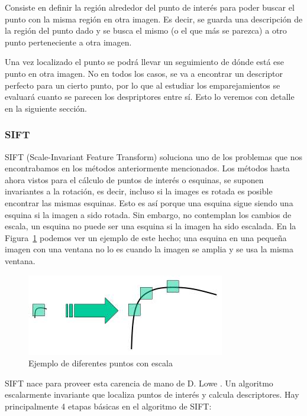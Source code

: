 Consiste en definir la región alrededor del punto de interés para poder buscar el punto con la misma región en otra imagen. Es decir, se guarda una descripción de la región del punto dado y se busca el mismo (o el que más se parezca) a otro punto perteneciente a otra imagen.

Una vez localizado el punto se podrá llevar un seguimiento de dónde está ese punto en otra imagen. No en todos los casos, se va a encontrar un descriptor perfecto para un cierto punto, por lo que al estudiar los emparejamientos se evaluará cuanto se parecen los despriptores entre sí. Esto lo veremos con detalle en la siguiente sección.

\subsubsection{SIFT}

SIFT (Scale-Invariant Feature Transform) soluciona uno de los problemas que nos encontrabamos en los métodos anteriormente mencionados. Los métodos hasta ahora vistos para el cálculo de puntos de interés o esquinas, se suponen invariantes a la rotación, es decir, incluso si la images es rotada es posible encontrar las mismas esquinas. Esto es así porque una esquina sigue siendo una esquina si la imagen a sido rotada. Sin embargo, no contemplan los cambios de escala, un esquina no puede ser una esquina si la imagen ha sido escalada. En la Figura~\ref{fig:sift_scale_invariant} podemos ver un ejemplo de este hecho; una esquina en una pequeña imagen con una ventana no lo es cuando la imagen se amplia y se usa la misma ventana.

\begin{figure}[ht]
\centering
\includegraphics[scale=0.7]{Figures/sift_scale_invariant.jpg}
\decoRule
\caption[siftScaleInvariant]{Ejemplo de diferentes puntos con escala}
\label{fig:sift_scale_invariant}
\end{figure}

SIFT nace para proveer esta carencia de mano de D. Lowe \parencite{Reference10}. Un algoritmo escalarmente invariante que  localiza puntos de interés y calcula descriptores. Hay principalmente 4 etapas básicas en el algoritmo de SIFT:


